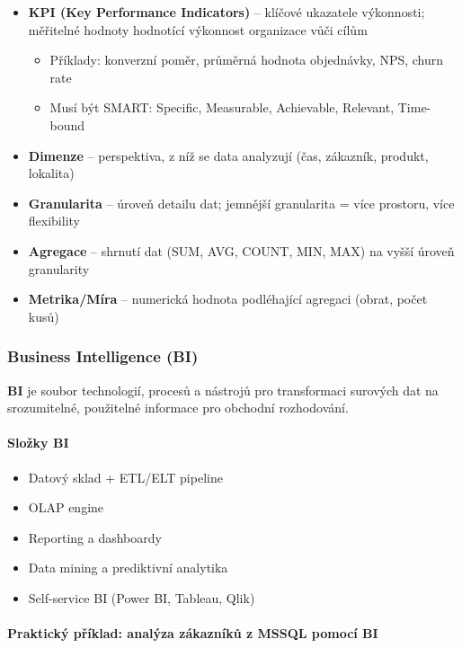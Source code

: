 \begin{itemize}
  \item \textbf{KPI (Key Performance Indicators)} -- klíčové ukazatele výkonnosti; měřitelné hodnoty
    hodnotící výkonnost organizace vůči cílům
    \begin{itemize}
      \item Příklady: konverzní poměr, průměrná hodnota objednávky, NPS, churn rate
      \item Musí být SMART: Specific, Measurable, Achievable, Relevant, Time-bound
    \end{itemize}
  \item \textbf{Dimenze} -- perspektiva, z níž se data analyzují (čas, zákazník, produkt, lokalita)
  \item \textbf{Granularita} -- úroveň detailu dat; jemnější granularita = více prostoru, více flexibility
  \item \textbf{Agregace} -- shrnutí dat (SUM, AVG, COUNT, MIN, MAX) na vyšší úroveň granularity
  \item \textbf{Metrika/Míra} -- numerická hodnota podléhající agregaci (obrat, počet kusů)
\end{itemize}

\subsubsection{Business Intelligence (BI)}

\textbf{BI} je soubor technologií, procesů a nástrojů pro transformaci surových dat na srozumitelné,
použitelné informace pro obchodní rozhodování.

\paragraph{Složky BI}
\begin{itemize}
  \item Datový sklad + ETL/ELT pipeline
  \item OLAP engine
  \item Reporting a dashboardy
  \item Data mining a prediktivní analytika
  \item Self-service BI (Power BI, Tableau, Qlik)
\end{itemize}

\paragraph{Praktický příklad: analýza zákazníků z MSSQL pomocí BI}

